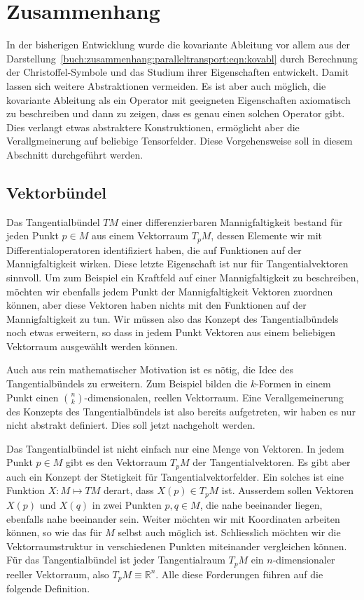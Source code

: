 %
%
%

%
%
\section{Zusammenhang
\label{buch:zusammenhang:section:zusammenhang}}
In der bisherigen Entwicklung wurde die kovariante Ableitung vor allem
aus der Darstellung~\eqref{buch:zusammenhang:paralleltransport:eqn:kovabl}
durch Berechnung der Christoffel-Symbole und das Studium ihrer
Eigenschaften entwickelt.
Damit lassen sich weitere Abstraktionen vermeiden.
Es ist aber auch möglich, die kovariante Ableitung als ein Operator
mit geeigneten Eigenschaften axiomatisch zu beschreiben und dann zu
zeigen, dass es genau einen solchen Operator gibt.
Dies verlangt etwas abstraktere Konstruktionen, ermöglicht aber
die Verallgmeinerung auf beliebige Tensorfelder.
Diese Vorgehensweise soll in diesem Abschnitt durchgeführt werden.

\subsection{Vektorbündel}
Das Tangentialbündel $TM$ einer differenzierbaren Mannigfaltigkeit
bestand für jeden Punkt $p\in M$ aus einem Vektorraum $T_pM$, dessen
Elemente wir mit Differentialoperatoren identifiziert haben, die
auf Funktionen auf der Mannigfaltigkeit wirken.
Diese letzte Eigenschaft ist nur für Tangentialvektoren sinnvoll.
Um zum Beispiel ein Kraftfeld auf einer Mannigfaltigkeit zu beschreiben,
möchten wir ebenfalls jedem Punkt der Mannigfaltigkeit Vektoren
zuordnen können, aber diese Vektoren haben nichts mit den Funktionen
auf der Mannigfaltigkeit zu tun.
Wir müssen also das Konzept des Tangentialbündels noch etwas
erweitern, so dass in jedem Punkt Vektoren aus einem beliebigen
Vektorraum ausgewählt werden können.

Auch aus rein mathematischer Motivation ist es nötig, die Idee des
Tangentialbündels zu erweitern.
Zum Beispiel bilden die $k$-Formen in einem Punkt einen
$\binom{n}{k}$-dimensionalen, reellen Vektorraum.
Eine Verallgemeinerung des Konzepts des Tangentialbündels ist also
bereits aufgetreten, wir haben es nur nicht abstrakt definiert.
Dies soll jetzt nachgeholt werden.

Das Tangentialbündel ist nicht einfach nur eine Menge von Vektoren.
In jedem Punkt $p\in M$ gibt es den Vektorraum $T_pM$ der Tangentialvektoren.
Es gibt aber auch ein Konzept der Stetigkeit für Tangentialvektorfelder.
Ein solches ist eine Funktion $X\colon M\mapsto TM$ derart, dass 
$X(p)\in T_pM$ ist.
Ausserdem sollen Vektoren $X(p)$ und $X(q)$ in zwei Punkten $p,q\in M$,
die nahe beeinander liegen, ebenfalls nahe beeinander sein.
Weiter möchten wir mit Koordinaten arbeiten können, so wie das für $M$
selbst auch möglich ist.
Schliesslich möchten wir die Vektorraumstruktur in verschiedenen
Punkten miteinander vergleichen können.
Für das Tangentialbündel ist jeder Tangentialraum $T_pM$ ein
$n$-dimensionaler reeller Vektorraum, also $T_pM \equiv \mathbb{R}^n$.
Alle diese Forderungen führen auf die folgende Definition.

